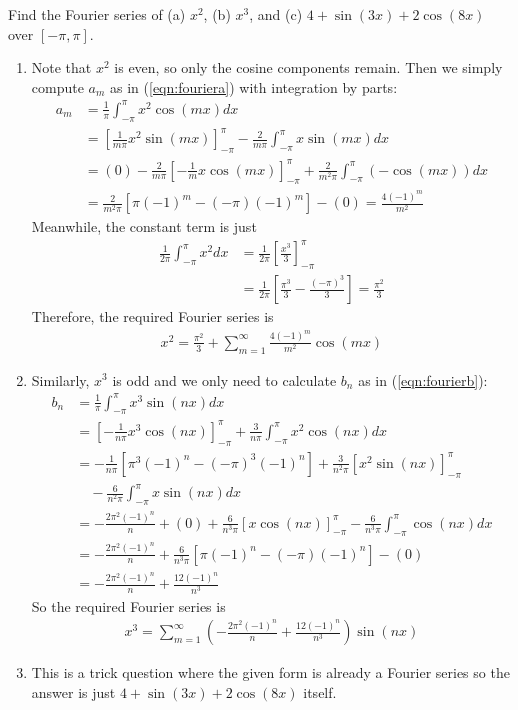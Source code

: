 \begin{Exercise}
Find the Fourier series of (a) $x^2$, (b) $x^3$, and (c) $4+\sin(3x)+2\cos(8x)$ over $[-\pi, \pi]$.
\end{Exercise}
\begin{Answer}
\begin{enumerate}[label=(\alph*)]
\item Note that $x^2$ is even, so only the cosine components remain. Then we simply compute $a_m$ as in (\ref{eqn:fouriera}) with integration by parts:
\begin{align*}
a_m &= \frac{1}{\pi} \int_{-\pi}^{\pi} x^2\cos(mx) dx \\
&= \left[\frac{1}{m\pi}x^2\sin(mx)\right]_{-\pi}^{\pi} - \frac{2}{m\pi} \int_{-\pi}^{\pi} x \sin(mx) dx \\
&= (0) - \frac{2}{m\pi} \left[-\frac{1}{m} x \cos(mx)\right]_{-\pi}^{\pi} + \frac{2}{m^2\pi} \int_{-\pi}^{\pi} (-\cos(mx)) dx \\
&= \frac{2}{m^2\pi} [\pi (-1)^m - (-\pi) (-1)^m] - (0) = \frac{4(-1)^m}{m^2}
\end{align*}
Meanwhile, the constant term is just
\begin{align*}
\frac{1}{2\pi} \int_{-\pi}^{\pi} x^2 dx &= \frac{1}{2\pi}\left[\frac{x^3}{3}\right]_{-\pi}^{\pi} \\\
&= \frac{1}{2\pi}\left[\frac{\pi^3}{3} - \frac{(-\pi)^3}{3}\right] = \frac{\pi^2}{3}
\end{align*}
Therefore, the required Fourier series is
\begin{align*}
x^2 = \frac{\pi^2}{3}+\sum_{m=1}^{\infty} \frac{4(-1)^m}{m^2} \cos(mx)
\end{align*}
\item Similarly, $x^3$ is odd and we only need to calculate $b_n$ as in (\ref{eqn:fourierb}):
\begin{align*}
b_n &= \frac{1}{\pi} \int_{-\pi}^{\pi} x^3\sin(nx) dx \\
&= \left[-\frac{1}{n\pi}x^3\cos(nx)\right]_{-\pi}^{\pi} + \frac{3}{n\pi}\int_{-\pi}^{\pi} x^2\cos(nx) dx \\
&= -\frac{1}{n\pi}\left[\pi^3 (-1)^n - (-\pi)^3 (-1)^n\right] + \frac{3}{n^2\pi}[x^2 \sin(nx)]_{-\pi}^{\pi} \\
&\quad - \frac{6}{n^2\pi}\int_{-\pi}^{\pi} x \sin (nx) dx \\
&= -\frac{2\pi^2(-1)^n}{n} + (0) + \frac{6}{n^3\pi} [x \cos (nx)]_{-\pi}^{\pi} - \frac{6}{n^3\pi} \int_{-\pi}^{\pi} \cos(nx) dx \\
&= -\frac{2\pi^2(-1)^n}{n} + \frac{6}{n^3\pi}[\pi (-1)^n - (-\pi) (-1)^n] - (0) \\
&= -\frac{2\pi^2(-1)^n}{n} + \frac{12(-1)^n}{n^3}
\end{align*}
So the required Fourier series is
\begin{align*}
x^3 = \sum_{m=1}^{\infty} \left(-\frac{2\pi^2(-1)^n}{n} + \frac{12(-1)^n}{n^3}\right) \sin(nx)
\end{align*}
\item This is a trick question where the given form is already a Fourier series so the answer is just $4+\sin(3x)+2\cos(8x)$ itself.
\end{enumerate}
\end{Answer}

